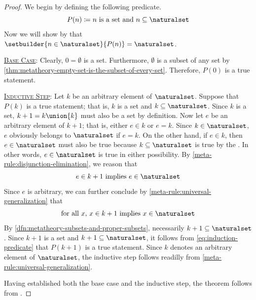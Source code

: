 \begin{proof}
    We begin by defining the following predicate.
    \begin{equation}
        \label{eq:induction-predicate}
        P(n) \coloneq \text{\( n \) is a set and \( n \subseteq \naturalset \)}
    \end{equation}
    Now we will show by  that \( \setbuilder{n \in \naturalset}{P(n)} = \naturalset \).

    \vspace{0.3cm}
    \noindent
    \underline{\scshape Base Case}:
    Clearly, \( 0 = \emptyset \) is a set. Furthermore, \( \emptyset \) is a subset of any set by \cref{thm:metatheory-empty-set-is-the-subset-of-every-set}.
    Therefore, \( P(0) \) is a true statement.

    \vspace{0.3cm}
    \noindent
    \underline{\scshape Inductive Step}: Let \( k \) be an arbitrary element of \( \naturalset \).
    Suppose that \( P(k) \) is a true statement; that is, \( k \) is a set and \( k \subseteq \naturalset \).
    Since \( k \) is a set, \( k + 1 = k \union \mleft\{ k \mright\} \) must also be a set by definition.
    Now let \( e \) be an arbitrary element of \( k + 1 \); that is, either \( e \in k \) or \( e = k \).
    Since \( k \in \naturalset \), \( e \) obviously belongs to \( \naturalset \) if \( e = k \).
    On the other hand, if \( e \in k \), then \( e \in \naturalset \) must also be true because \( k \subseteq \naturalset \) is true by the
    .
    In other words, \( e \in \naturalset \) is true in either possibility.
    By \cref{meta-rule:disjunction-elimination}, we reason that
    \begin{equation*}
        e \in k + 1 \ \text{implies} \ e \in \naturalset
    \end{equation*}
    Since \( e \) is arbitrary, we can further conclude by \cref{meta-rule:universal-generalization} that
    \begin{equation*}
        \text{for all \( x \), \( x \in k + 1 \) implies \( x \in \naturalset \)}
    \end{equation*}
    By \cref{dfn:metatheory-subsets-and-proper-subsets}, necessarily \( k + 1 \subseteq \naturalset \).
    Since \( k + 1 \) is a set and \( k + 1 \subseteq \naturalset \), it follows from \eqref{eq:induction-predicate} that
    \( P(k + 1) \) is a true statement.
    Since \( k \) denotes an arbitrary element of \( \naturalset \), the inductive step follows readilly from \cref{meta-rule:universal-generalization}.

    \vspace{0.3cm}
    \noindent
    Having established both the base case and the inductive step, the theorem follows from .
\end{proof}

